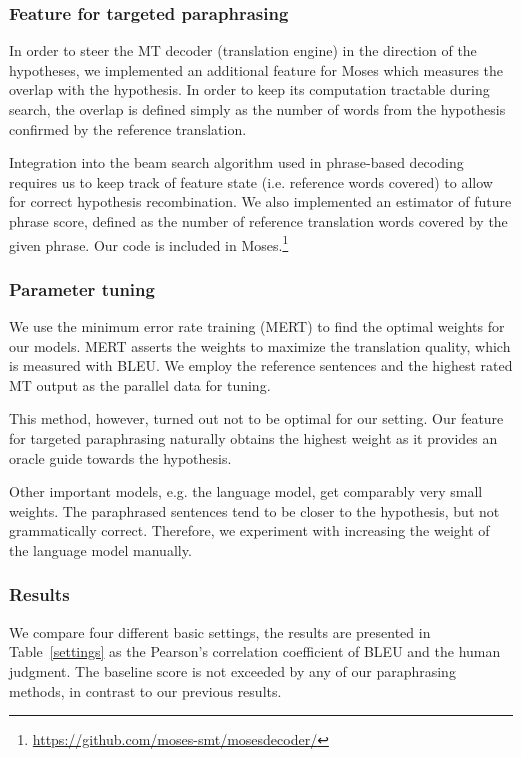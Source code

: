 \documentclass[11pt]{article}
\def\Tref#1{Table~\ref{#1}}
\def\Fref#1{Figure~\ref{#1}}
\def\footurl#1{\footnote{\url{#1}}}
\begin{document}
\subsubsection{Feature for targeted paraphrasing}
In order to steer the MT decoder (translation engine) in the direction of the 
hypotheses, we implemented an additional feature for Moses which measures the 
overlap with the hypothesis. In order to keep its computation tractable during 
search, the overlap is defined simply as the number of words from the hypothesis 
confirmed by the reference translation.

Integration into the beam search algorithm used in phrase-based decoding
requires us to keep track of feature state (i.e. reference words covered) to
allow for correct hypothesis recombination. We also implemented an estimator of
future phrase score, defined as the number of reference translation words
covered by the given phrase. Our code is included in
Moses.\footurl{https://github.com/moses-smt/mosesdecoder/}

\subsubsection{Parameter tuning}
We use the minimum error rate training (MERT) \cite{mert} to find the optimal 
weights for our models. MERT asserts the weights to maximize the translation 
quality, which is measured with BLEU. We employ the reference sentences and the 
highest rated MT output as the parallel data for tuning. 

This method, however, turned out not to be optimal for our setting. Our feature for 
targeted paraphrasing naturally obtains the highest weight as it provides an oracle 
guide towards the hypothesis.

Other important models, e.g. the language model, get comparably very small weights. The 
paraphrased sentences tend to be closer to the hypothesis, but not grammatically correct. 
Therefore, we experiment with increasing the weight of the language model manually. 

\subsubsection{Results}
We compare four different basic settings, the results are presented in \Tref{settings}
as the Pearson’s correlation coefficient of BLEU and the human judgment. 
The baseline
score is not exceeded by any of our paraphrasing methods, in contrast to  our previous 
results. 
\end{document}
